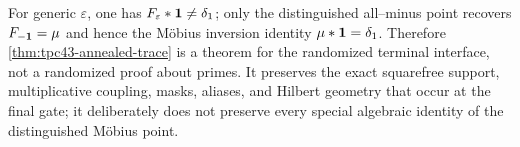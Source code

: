 \begin{remark}
\label{rem:tpc43-random-convolution-boundary}
For generic \(\varepsilon\), one has
\(F_\varepsilon*\mathbf 1\ne\delta_1\); only the distinguished all--minus
point recovers \(F_{-\mathbf 1}=\mu\) and hence the M\"obius inversion
identity \(\mu*\mathbf 1=\delta_1\).  Therefore
\cref{thm:tpc43-annealed-trace} is a theorem for the randomized terminal
interface, not a randomized proof about primes.  It preserves the exact
squarefree support, multiplicative coupling, masks, aliases, and Hilbert
geometry that occur at the final gate; it deliberately does not preserve
every special algebraic identity of the distinguished M\"obius point.
\end{remark}
